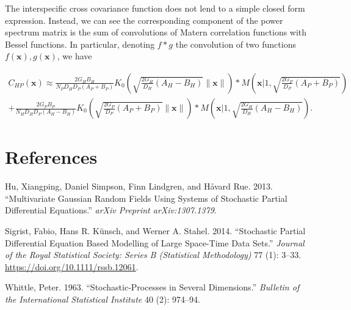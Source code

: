 \documentclass{article}
\begin{document}
The interspecific cross covariance function does not lend to a simple
closed form expression. Instead, we can see the corresponding component
of the power spectrum matrix is the sum of convolutions of Matern
correlation functions with Bessel functions. In particular, denoting
\(f*g\) the convolution of two functions \(f(\pmb x),g(\pmb x)\), we
have

\begin{multline}
  C_{HP}(\pmb x) \approx \frac{2G_HB_H}{N_PD_HD_P(A_P+B_P)}K_0\left(\sqrt{\frac{2G_H}{D_H}(A_H-B_H)}\|\pmb x\|\right)*M\left(\pmb x\Big|1,\sqrt{\frac{2G_P}{D_P}(A_P+B_P)}\right) \\ + \frac{2G_PB_P}{N_HD_HD_P(A_H-B_H)}K_0\left(\sqrt{\frac{2G_P}{D_P}(A_P+B_P)}\|\pmb x\|\right) * M\left(\pmb x\Big|1,\sqrt{\frac{2G_H}{D_H}(A_H-B_H)}\right).
\end{multline}

\newpage

\hypertarget{references}{%
\section*{References}\label{references}}

\hypertarget{refs}{}
\leavevmode\hypertarget{ref-hu2013multivariate}{}%
Hu, Xiangping, Daniel Simpson, Finn Lindgren, and Håvard Rue. 2013.
``Multivariate Gaussian Random Fields Using Systems of Stochastic
Partial Differential Equations.'' \emph{arXiv Preprint arXiv:1307.1379}.

\leavevmode\hypertarget{ref-Sigrist2014}{}%
Sigrist, Fabio, Hans R. Künsch, and Werner A. Stahel. 2014. ``Stochastic
Partial Differential Equation Based Modelling of Large Space-Time Data
Sets.'' \emph{Journal of the Royal Statistical Society: Series B
(Statistical Methodology)} 77 (1): 3--33.
\url{https://doi.org/10.1111/rssb.12061}.

\leavevmode\hypertarget{ref-whittle1963stochastic}{}%
Whittle, Peter. 1963. ``Stochastic-Processes in Several Dimensions.''
\emph{Bulletin of the International Statistical Institute} 40 (2):
974--94.



\end{document}
